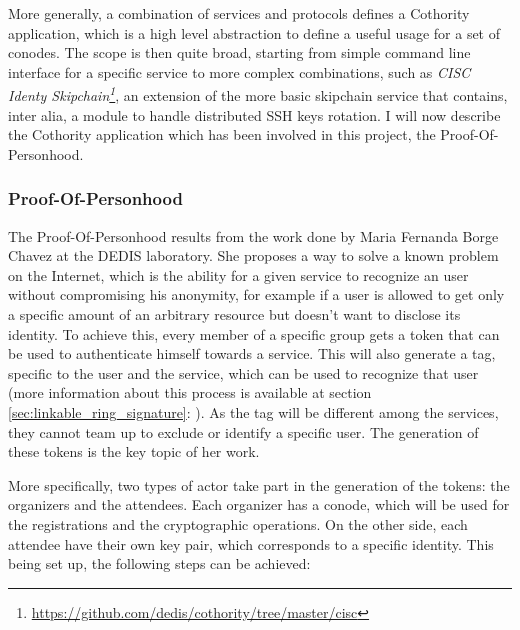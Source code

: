 More generally, a combination of services and protocols defines a Cothority application, which is a high level abstraction to define a useful usage for a set of conodes. The scope is then quite broad, starting from simple command line interface for a specific service to more complex combinations, such as \textit{CISC Identy Skipchain\footnote{\url{https://github.com/dedis/cothority/tree/master/cisc}}}, an extension of the more basic skipchain service that contains, inter alia, a module to handle distributed SSH keys rotation. I will now describe the Cothority application which has been involved in this project, the Proof-Of-Personhood.
\subsubsection{Proof-Of-Personhood}
The Proof-Of-Personhood results from the work done by Maria Fernanda Borge Chavez at the DEDIS laboratory. She proposes a way to solve a known problem on the Internet, which is the ability for a given service to recognize an user without compromising his anonymity, for example if a user is allowed to get only a specific amount of an arbitrary resource but doesn't want to disclose its identity. To achieve this, every member of a specific group gets a token that can be used to authenticate himself towards a service. This will also generate a tag, specific to the user and the service, which can be used to recognize that user (more information about this process is available at section \ref{sec:linkable_ring_signature}: ). As the tag will be different among the services, they cannot team up to exclude or identify a specific user. The generation of these tokens is the key topic of her work.

More specifically, two types of actor take part in the generation of the tokens: the organizers and the attendees. Each organizer has a conode, which will be used for the registrations and the cryptographic operations. On the other side, each attendee have their own key pair, which corresponds to a specific identity. This being set up, the following steps can be achieved:

